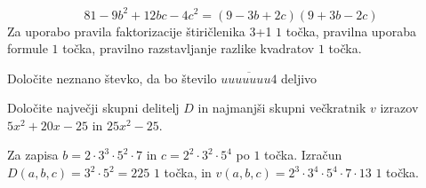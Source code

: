 \documentclass[addpoints]{exam}
\begin{document}
\begin{questions}
\begin{parts}
        \begin{solution}[3cm]
            $$81-9b^2+12bc-4c^2=(9-3b+2c)(9+3b-2c)$$
            Za uporabo pravila faktorizacije štiričlenika 3+1 $1$ točka, pravilna uporaba formule $1$ točka, pravilno razstavljanje razlike kvadratov $1$ točka.
        \end{solution}


    \end{parts}



    \question
    Določite neznano števko, da bo število $\overline{uuuuuuu4}$ deljivo




    \question[4]
    Določite največji skupni delitelj $D$ in najmanjši skupni večkratnik $v$ izrazov $5x^2+20x-25$ in $25x^2-25$.

    \begin{solution}[6cm]
        Za zapisa $b=2\cdot 3^3\cdot 5^2\cdot 7$ in $c=2^2\cdot 3^2\cdot 5^4$ po $1$ točka. 
        Izračun $D(a,b,c)=3^2\cdot 5^2=225$ $1$ točka, in $v(a,b,c)=2^3\cdot 3^4\cdot 5^4\cdot 7\cdot 13$ $1$ točka.
    \end{solution}
    

\end{questions}
\end{document}
